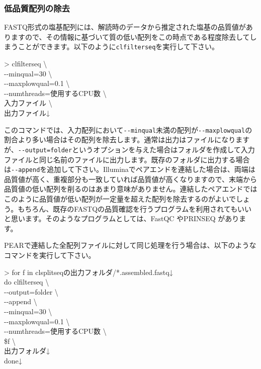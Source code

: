 \documentclass[titlepage,10pt,a4paper]{jsbook}
\newenvironment{cmd}{\begin{oframed}\raggedright\ttfamily\footnotesize\setlength{\baselineskip}{1.4em}}{\end{oframed}\vspace{-1em}}
\begin{document}
\subsubsection{低品質配列の除去}

FASTQ形式の塩基配列には、解読時のデータから推定された塩基の品質値がありますので、その情報に基づいて質の低い配列をこの時点である程度除去してしまうことができます。以下のように\texttt{clfilterseq}を実行して下さい。

\begin{cmd}
{\textgreater} clfilterseq {\textbackslash}\\
{-}{-}minqual=30 {\textbackslash}\\
{-}{-}maxplowqual=0.1 {\textbackslash}\\
{-}{-}numthreads=使用するCPU数 {\textbackslash}\\
入力ファイル {\textbackslash}\\
出力ファイル↓
\end{cmd}

このコマンドでは、入力配列において\texttt{{-}{-}minqual}未満の配列が\texttt{{-}{-}maxplowqual}の割合より多い場合はその配列を除去します。通常は出力はファイルになりますが、\texttt{{-}{-}output=folder}というオプションを与えた場合はフォルダを作成して入力ファイルと同じ名前のファイルに出力します。既存のフォルダに出力する場合は\texttt{{-}{-}append}を追加して下さい。Illuminaでペアエンドを連結した場合は、両端は品質値が高く、重複部分も一致していれば品質値が高くなりますので、末端から品質値の低い配列を削るのはあまり意味がありません。連結したペアエンドではこのように品質値が低い配列が一定量を超えた配列を除去するのがよいでしょう。もちろん、既存のFASTQの品質確認を行うプログラムを利用されてもいいと思います。そのようなプログラムとしては、FastQC \citep{Andrews2010}やPRINSEQ \citep{Schmieder2011}があります。

PEARで連結した全配列ファイルに対して同じ処理を行う場合は、以下のようなコマンドを実行して下さい。

\begin{cmd}
{\textgreater} for f in clsplitseqの出力フォルダ/*.assembled.fastq↓\\
do clfilterseq {\textbackslash}\\
{-}{-}output=folder {\textbackslash}\\
{-}{-}append {\textbackslash}\\
{-}{-}minqual=30 {\textbackslash}\\
{-}{-}maxplowqual=0.1 {\textbackslash}\\
{-}{-}numthreads=使用するCPU数 {\textbackslash}\\
\$f {\textbackslash}\\
出力フォルダ↓\\
done↓
\end{cmd}
\end{document}
